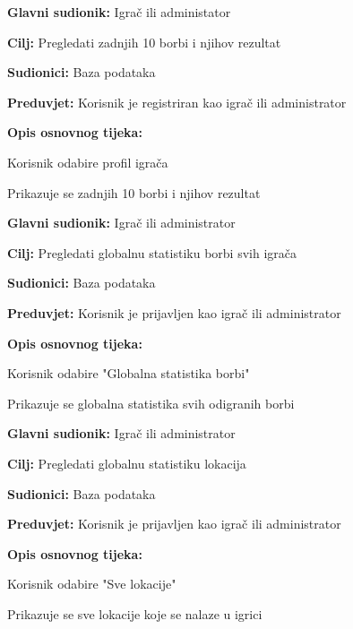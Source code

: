 \noindent {}
\begin{packed_item}
    \item \textbf{Glavni sudionik: }Igrač ili administator
    \item \textbf{Cilj: } Pregledati zadnjih 10 borbi i njihov rezultat
    \item \textbf{Sudionici: }Baza podataka
    \item \textbf{Preduvjet: }Korisnik je registriran kao igrač ili administrator
    \item \textbf{Opis osnovnog tijeka: }
    \item[] \begin{packed_enum}
        \item Korisnik odabire profil igrača
        \item Prikazuje se zadnjih 10 borbi i njihov rezultat
    \end{packed_enum}
\end{packed_item}

\noindent {}
\begin{packed_item}
    \item \textbf{Glavni sudionik: }Igrač ili administrator
    \item \textbf{Cilj: }Pregledati globalnu statistiku borbi svih igrača
    \item \textbf{Sudionici: }Baza podataka
    \item \textbf{Preduvjet: }Korisnik je prijavljen kao igrač ili administrator
    \item \textbf{Opis osnovnog tijeka: }
    \item[] \begin{packed_enum}
        \item Korisnik odabire "Globalna statistika borbi"
        \item Prikazuje se globalna statistika svih odigranih borbi
    \end{packed_enum}
\end{packed_item}

\noindent {}
\begin{packed_item}
    \item \textbf{Glavni sudionik: }Igrač ili administrator
    \item \textbf{Cilj: }Pregledati globalnu statistiku lokacija
    \item \textbf{Sudionici: }Baza podataka
    \item \textbf{Preduvjet: }Korisnik je prijavljen kao igrač ili administrator
    \item \textbf{Opis osnovnog tijeka: }
    \item[] \begin{packed_enum}
        \item Korisnik odabire "Sve lokacije"
        \item Prikazuje se sve lokacije koje se nalaze u igrici
    \end{packed_enum}
\end{packed_item}

